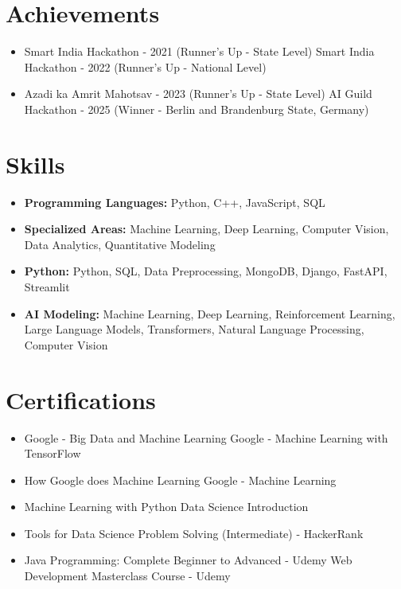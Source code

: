 \documentclass[a4paper,10pt]{article}
\begin{document}
\section*{Achievements}
\begin{itemize}
\item Smart India Hackathon - 2021 (Runner's Up - State Level) \hfill Smart India Hackathon - 2022 (Runner's Up - National Level)
\item Azadi ka Amrit Mahotsav - 2023 (Runner's Up - State Level) \hfill AI Guild Hackathon - 2025 (Winner - Berlin and Brandenburg State, Germany)
\end{itemize}

\section*{Skills}
\begin{itemize}
  \item \textbf{Programming Languages:} Python, C++, JavaScript, SQL
  \item \textbf{Specialized Areas:} Machine Learning, Deep Learning, Computer Vision, Data Analytics, Quantitative Modeling
  \item \textbf{Python:} Python, SQL, Data Preprocessing, MongoDB, Django, FastAPI, Streamlit
  \item \textbf{AI Modeling:} Machine Learning, Deep Learning, Reinforcement Learning, Large Language Models, Transformers, Natural Language Processing, Computer Vision
\end{itemize}

\section*{Certifications}
\begin{itemize}
\item Google - Big Data and Machine Learning \hfill Google - Machine Learning with TensorFlow
\item How Google does Machine Learning \hfill Google - Machine Learning
\item Machine Learning with Python \hfill Data Science Introduction
\item Tools for Data Science \hfill Problem Solving (Intermediate) - HackerRank
\item Java Programming: Complete Beginner to Advanced - Udemy \hfill Web Development Masterclass Course - Udemy
\end{itemize}
\end{document}
